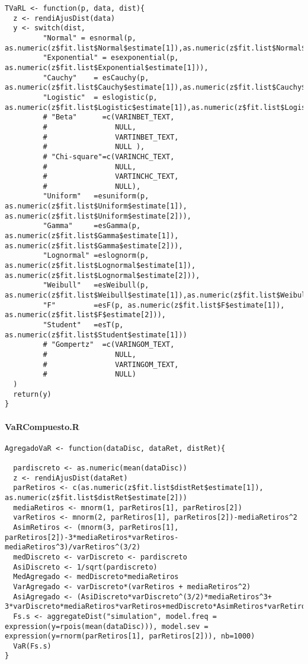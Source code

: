 \documentclass[]{article}
\begin{document}
\begin{verbatim}
TVaRL <- function(p, data, dist){
  z <- rendiAjusDist(data)
  y <- switch(dist, 
         "Normal" = esnormal(p, as.numeric(z$fit.list$Normal$estimate[1]),as.numeric(z$fit.list$Normal$estimate[2])),
         "Exponential" = esexponential(p, as.numeric(z$fit.list$Exponential$estimate[1])),
         "Cauchy"    = esCauchy(p, as.numeric(z$fit.list$Cauchy$estimate[1]),as.numeric(z$fit.list$Cauchy$estimate[2])),
         "Logistic"  = eslogistic(p, as.numeric(z$fit.list$Logistic$estimate[1]),as.numeric(z$fit.list$Logistic$estimate[2])),
         # "Beta"      =c(VARINBET_TEXT,
         #                NULL,
         #                VARTINBET_TEXT,
         #                NULL ),
         # "Chi-square"=c(VARINCHC_TEXT,
         #                NULL,
         #                VARTINCHC_TEXT,
         #                NULL),
         "Uniform"   =esuniform(p, as.numeric(z$fit.list$Uniform$estimate[1]), as.numeric(z$fit.list$Uniform$estimate[2])),
         "Gamma"     =esGamma(p, as.numeric(z$fit.list$Gamma$estimate[1]), as.numeric(z$fit.list$Gamma$estimate[2])),
         "Lognormal" =eslognorm(p, as.numeric(z$fit.list$Lognormal$estimate[1]), as.numeric(z$fit.list$Lognormal$estimate[2])),
         "Weibull"   =esWeibull(p, as.numeric(z$fit.list$Weibull$estimate[1]),as.numeric(z$fit.list$Weibull$estimate[2])),
         "F"         =esF(p, as.numeric(z$fit.list$F$estimate[1]), as.numeric(z$fit.list$F$estimate[2])),
         "Student"   =esT(p, as.numeric(z$fit.list$Student$estimate[1]))
         # "Gompertz"  =c(VARINGOM_TEXT,
         #                NULL,
         #                VARTINGOM_TEXT,
         #                NULL)
  )
  return(y)
}
\end{verbatim}

\hypertarget{varcompuesto.r}{%
\paragraph{VaRCompuesto.R}\label{varcompuesto.r}}

\begin{verbatim}
AgregadoVaR <- function(dataDisc, dataRet, distRet){
  
  pardiscreto <- as.numeric(mean(dataDisc))
  z <- rendiAjusDist(dataRet)
  parRetiros <- c(as.numeric(z$fit.list$distRet$estimate[1]), as.numeric(z$fit.list$distRet$estimate[2]))
  mediaRetiros <- mnorm(1, parRetiros[1], parRetiros[2])
  varRetiros <- mnorm(2, parRetiros[1], parRetiros[2])-mediaRetiros^2
  AsimRetiros <- (mnorm(3, parRetiros[1], parRetiros[2])-3*mediaRetiros*varRetiros-mediaRetiros^3)/varRetiros^(3/2)
  medDiscreto <- varDiscreto <- pardiscreto
  AsiDiscreto <- 1/sqrt(pardiscreto)
  MedAgregado <- medDiscreto*mediaRetiros
  VarAgregado <- varDiscreto*(varRetiros + mediaRetiros^2)
  AsiAgregado <- (AsiDiscreto*varDiscreto^(3/2)*mediaRetiros^3+ 3*varDiscreto*mediaRetiros*varRetiros+medDiscreto*AsimRetiros*varRetiros^(3/2))/VarAgregado^(3/2)
  Fs.s <- aggregateDist("simulation", model.freq = expression(y=rpois(mean(dataDisc))), model.sev = expression(y=rnorm(parRetiros[1], parRetiros[2])), nb=1000)
  VaR(Fs.s)
}
\end{verbatim}
\end{document}
